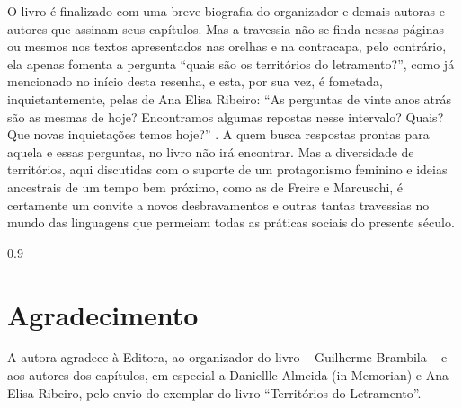 \documentclass[portuguese]{textolivre}
\begin{document}
O livro  é finalizado com uma breve biografia do organizador e demais autoras e autores que assinam seus capítulos. Mas a travessia não se finda nessas páginas ou mesmos nos textos apresentados nas orelhas e na contracapa, pelo contrário, ela apenas fomenta a pergunta “quais são os territórios do letramento?”, como já mencionado no início desta resenha, e esta, por sua vez, é fometada, inquietantemente, pelas de Ana Elisa Ribeiro: “As perguntas de vinte anos atrás são as mesmas de hoje? Encontramos algumas repostas nesse intervalo? Quais? Que novas inquietações temos hoje?” \cite[p. 86]{ribeiro2024territorios}. A quem busca respostas prontas para aquela e essas perguntas, no livro não irá encontrar. Mas a diversidade de territórios, aqui discutidas com o suporte de um protagonismo feminino e ideias ancestrais de um tempo bem próximo, como as de Freire e Marcuschi, é certamente um convite a novos desbravamentos e outras tantas travessias no mundo das linguagens que permeiam todas as práticas sociais do presente século. 

\begin{spacing}{0.9}
\printbibliography\label{sec-bib}
\end{spacing}

\section*{\fontsize{10}{12}\selectfont Agradecimento}
A autora agradece à Editora, ao organizador do livro – Guilherme Brambila – e aos autores dos capítulos, em especial a Daniellle Almeida (in Memorian) e Ana Elisa Ribeiro, pelo envio do exemplar do livro “Territórios do Letramento”.

\begin{dataavailability}
\end{dataavailability}
\end{document}
